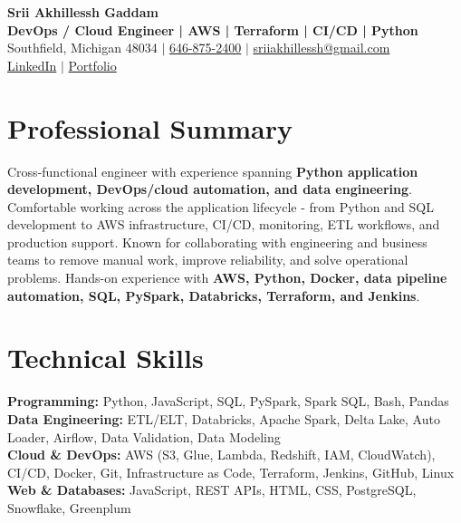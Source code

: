 \documentclass[letterpaper,10pt]{article}
\begin{document}
\fontsize{9.35pt}{10.45pt}\selectfont

\begin{center}
    {\LARGE \textbf{Srii Akhillessh Gaddam}} \\[-1pt]
    \textbf{DevOps / Cloud Engineer | AWS | Terraform | CI/CD | Python} \\[2pt]
    Southfield, Michigan 48034 $|$
    \href{tel:6468752400}{646-875-2400} $|$
    \href{mailto:sriiakhillessh@gmail.com}{sriiakhillessh@gmail.com} \\[1pt]
    \href{https://www.linkedin.com/in/srii-akhiilessh-gaddam-b48668191/}{LinkedIn} $|$
    \href{https://sriiakhillesshg.github.io/portfolio/}{Portfolio}
\end{center}
\vspace{-8pt}

\section{Professional Summary}
\small{Cross-functional engineer with experience spanning \textbf{Python application development, DevOps/cloud automation, and data engineering}. Comfortable working across the application lifecycle - from Python and SQL development to AWS infrastructure, CI/CD, monitoring, ETL workflows, and production support. Known for collaborating with engineering and business teams to remove manual work, improve reliability, and solve operational problems. Hands-on experience with \textbf{AWS, Python, Docker, data pipeline automation, SQL, PySpark, Databricks, Terraform, and Jenkins}.}

\section{Technical Skills}
\small{
\textbf{Programming:} Python, JavaScript, SQL, PySpark, Spark SQL, Bash, Pandas \\
\textbf{Data Engineering:} ETL/ELT, Databricks, Apache Spark, Delta Lake, Auto Loader, Airflow, Data Validation, Data Modeling \\
\textbf{Cloud \& DevOps:} AWS (S3, Glue, Lambda, Redshift, IAM, CloudWatch), CI/CD, Docker, Git, Infrastructure as Code, Terraform, Jenkins, GitHub, Linux \\
\textbf{Web \& Databases:} JavaScript, REST APIs, HTML, CSS, PostgreSQL, Snowflake, Greenplum
}
\end{document}
